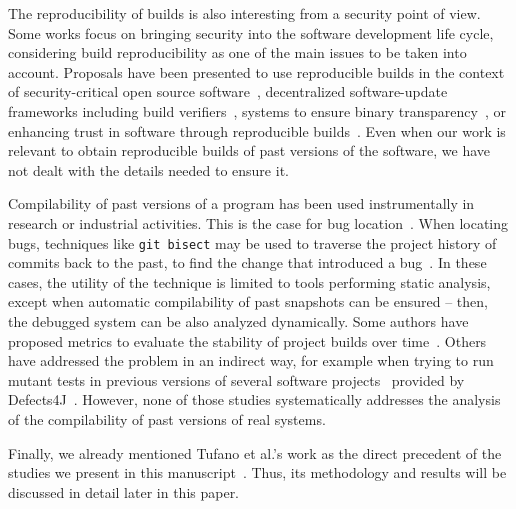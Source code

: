The reproducibility of builds is also interesting from a security point of view.
Some works focus on bringing security into the software development life cycle, considering build reproducibility as one of the main issues to be taken into account. Proposals have been presented to use reproducible builds in the context of security-critical open source software~\cite{deCarnedeCarnavalet:2014:CIV:2664243.2664288}, decentralized software-update frameworks including build verifiers~\cite{nikitin2017chainiac}, systems to ensure binary transparency~\cite{hassan2017automatic}, or enhancing trust in software through reproducible builds~\cite{Skrimstad:Thesis:2018}.
Even when our work is relevant to obtain reproducible builds of past versions of the software, we have not dealt with the details needed to ensure it.

Compilability of past versions of a program has been used instrumentally in research or industrial activities.
This is the case for bug location~\cite{Sliwerski:2005:CIF:1083142.1083147,Asaduzzaman:2012:BIC:2664446.2664463,Murgia:2010:MLA:1852786.1852794,Zimmermann:2006:MVA:1137983.1138001,Zimmermann2008}.
When locating bugs, techniques like \texttt{git bisect} may be used to traverse the project history of commits back to the past, to find the change that introduced a bug~\cite{spinellis2012git,meneely2013patch}. In these cases, the utility of the technique is limited to tools performing static analysis, except when automatic compilability of past snapshots can be ensured -- then, the debugged system can be also analyzed dynamically.
Some authors have proposed metrics to evaluate the stability of project builds over time~\cite{6405296}.
Others have addressed the problem in an indirect way, for example when trying to run mutant tests in previous versions of several software projects~\cite{Just:2014:MVS:2635868.2635929} provided by Defects4J~\cite{Just:2014:DDE:2610384.2628055}. However, none of those studies systematically addresses the analysis of the compilability of past versions of real systems.

Finally, we already mentioned Tufano et al.'s work as the direct precedent of the studies we present in this manuscript~\cite{tufano2017there}. Thus, its methodology and results will be discussed in detail later in this paper.
